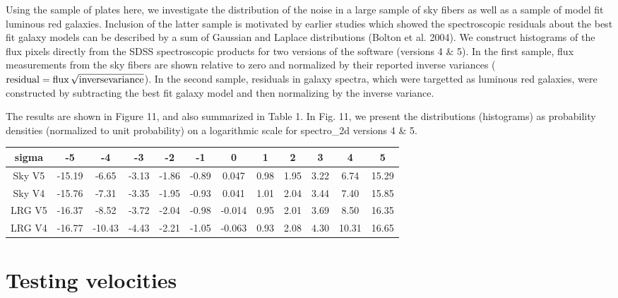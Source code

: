 \documentclass[12pt,preprint]{aastex}
\begin{document}
Using the sample of plates here, we investigate the distribution of the 
noise in a large sample of sky fibers as
well as a sample of model fit luminous red galaxies.  Inclusion of
the latter sample is motivated by earlier studies which showed 
the spectroscopic residuals about the best fit galaxy models 
can be described by a sum of Gaussian and Laplace 
distributions (Bolton et al. 2004).  We construct histograms of the flux
pixels directly from the SDSS spectroscopic products for two versions
of the software (versions 4 \& 5).  In the first sample, flux measurements
from the sky fibers are shown relative to zero and normalized by their reported
inverse variances 
(${\rm residual} = {\rm flux} \, \sqrt{\rm inverse variance}$).  
In the second sample, residuals in galaxy spectra, 
which were targetted as luminous red galaxies, were constructed by subtracting
the best fit galaxy model and then normalizing by the inverse variance.

The results are shown in Figure 11, and also summarized in Table 1.
In Fig. 11, we present the distributions (histograms) as 
probability densities (normalized to unit probability) on a logarithmic 
scale for spectro\_2d versions 4 \& 5.   

\begin{table}
\begin{tabular}{cccccccccccc}
\hline
sigma &   -5   &  -4   &   -3  &   -2  &  -1   & 0 &  1   &  2 &  3   & 4 & 5 \\
\hline
\hline
Sky V5 & -15.19 & -6.65 & -3.13 & -1.86 & -0.89 &  0.047  & 0.98 &  1.95 &  3.22 &  6.74 & 15.29 \\
Sky V4 & -15.76 & -7.31 & -3.35 & -1.95 & -0.93 &  0.041  & 1.01 &  2.04 &  3.44 &  7.40 & 15.85 \\
LRG V5 & -16.37 & -8.52 & -3.72 & -2.04 & -0.98 & -0.014  & 0.95 &  2.01 &  3.69 &  8.50 & 16.35 \\
LRG V4 & -16.77 &-10.43 & -4.43 & -2.21 & -1.05 & -0.063  & 0.93 &  2.08 &  4.30 & 10.31 & 16.65 \\
\hline
\end{tabular}
\end{table}


\section{Testing velocities}

\end{document}
